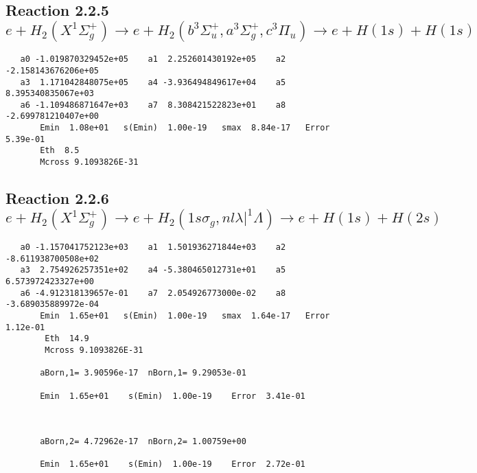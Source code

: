 \documentclass[12pt,dvipdfmx]{article}
\begin{document}
\newpage
\subsection{
Reaction 2.2.5 $e + H_2(X^1\Sigma_g^+) \rightarrow e + H_2(b^3\Sigma_u^+, a^3\Sigma_g^+, c^3\Pi_u) \rightarrow e + H(1s) + H(1s)$}






%








\begin{small}\begin{verbatim}
   a0 -1.019870329452e+05    a1  2.252601430192e+05    a2 -2.158143676206e+05
   a3  1.171042848075e+05    a4 -3.936494849617e+04    a5  8.395340835067e+03
   a6 -1.109486871647e+03    a7  8.308421522823e+01    a8 -2.699781210407e+00
       Emin  1.08e+01   s(Emin)  1.00e-19   smax  8.84e-17   Error  5.39e-01
       Eth  8.5
       Mcross 9.1093826E-31
\end{verbatim}\end{small}




\newpage
\subsection{
Reaction 2.2.6 $e + H_2(X^1\Sigma_g^+) \rightarrow e + H_2(1s\sigma_g,nl\lambda|^1\Lambda) \rightarrow e +  H(1s) + H(2s)$}
















\begin{small}\begin{verbatim}
   a0 -1.157041752123e+03    a1  1.501936271844e+03    a2 -8.611938700508e+02
   a3  2.754926257351e+02    a4 -5.380465012731e+01    a5  6.573972423327e+00
   a6 -4.912318139657e-01    a7  2.054926773000e-02    a8 -3.689035889972e-04
       Emin  1.65e+01   s(Emin)  1.00e-19   smax  1.64e-17   Error  1.12e-01
        Eth  14.9
        Mcross 9.1093826E-31

       aBorn,1= 3.90596e-17  nBorn,1= 9.29053e-01

       Emin  1.65e+01    s(Emin)  1.00e-19    Error  3.41e-01



       aBorn,2= 4.72962e-17  nBorn,2= 1.00759e+00

       Emin  1.65e+01    s(Emin)  1.00e-19    Error  2.72e-01
\end{verbatim}\end{small}
\end{document}
